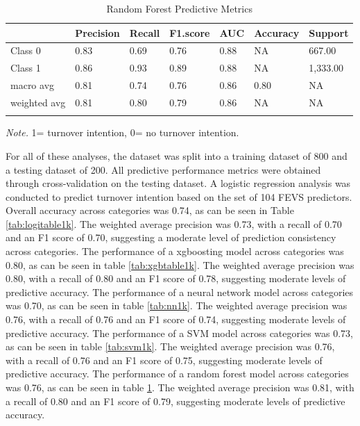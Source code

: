 \documentclass[
  man]{apa7}
\begin{document}
\begin{table}[tbp]

\begin{center}
\begin{threeparttable}

\caption{\label{tab:rf1k}Random Forest Predictive Metrics}

\begin{tabular}{lllllll}
\toprule
 & \multicolumn{1}{c}{Precision} & \multicolumn{1}{c}{Recall} & \multicolumn{1}{c}{F1.score} & \multicolumn{1}{c}{AUC} & \multicolumn{1}{c}{Accuracy} & \multicolumn{1}{c}{Support}\\
\midrule
Class 0 & 0.83 & 0.69 & 0.76 & 0.88 & NA & 667.00\\
Class 1 & 0.86 & 0.93 & 0.89 & 0.88 & NA & 1,333.00\\
macro avg & 0.81 & 0.74 & 0.76 & 0.86 & 0.80 & NA\\
weighted avg & 0.81 & 0.80 & 0.79 & 0.86 & NA & NA\\
\bottomrule
\addlinespace
\end{tabular}

\begin{tablenotes}[para]
\normalsize{\textit{Note.} 1= turnover intention, 0= no turnover intention.}
\end{tablenotes}

\end{threeparttable}
\end{center}

\end{table}

For all of these analyses, the dataset was split into a training dataset of 800 and a testing dataset of 200. All predictive performance metrics were obtained through cross-validation on the testing dataset. A logistic regression analysis was conducted to predict turnover intention based on the set of 104 FEVS predictors. Overall accuracy across categories was 0.74, as can be seen in Table \ref{tab:logitable1k}. The weighted average precision was 0.73, with a recall of 0.70 and an F1 score of 0.70, suggesting a moderate level of prediction consistency across categories.
The performance of a xgboosting model across categories was 0.80, as can be seen in table \ref{tab:xgbtable1k}. The weighted average precision was 0.80, with a recall of 0.80 and an F1 score of 0.78, suggesting moderate levels of predictive accuracy.
The performance of a neural network model across categories was 0.70, as can be seen in table \ref{tab:nn1k}. The weighted average precision was 0.76, with a recall of 0.76 and an F1 score of 0.74, suggesting moderate levels of predictive accuracy.
The performance of a SVM model across categories was 0.73, as can be seen in table \ref{tab:svm1k}. The weighted average precision was 0.76, with a recall of 0.76 and an F1 score of 0.75, suggesting moderate levels of predictive accuracy.
The performance of a random forest model across categories was 0.76, as can be seen in table \ref{tab:rf1k}. The weighted average precision was 0.81, with a recall of 0.80 and an F1 score of 0.79, suggesting moderate levels of predictive accuracy.
\end{document}
